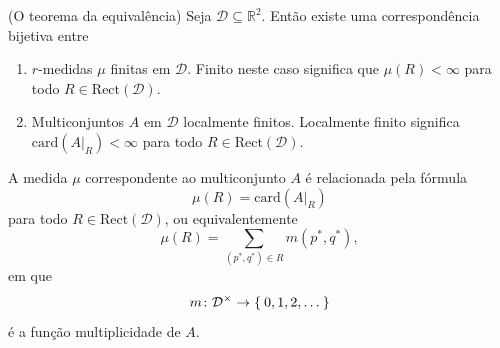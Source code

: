 \begin{teo}{(O teorema da equivalência)}\label{teo:equiv_meas}
    Seja $\mathcal{D} \subseteq \mathbb{R}^2$. Então existe uma correspondência bijetiva
    entre
    \begin{enumerate}
        \item $r$-medidas $\mu$ finitas em $\mathcal{D}$. Finito neste caso significa que 
        $\mu(R) < \infty$ para todo $R \in \text{Rect}(\mathcal{D})$.
        \item Multiconjuntos $A$ em $\mathcal{D}$ localmente finitos. Localmente finito significa
        $\text{card}(\left.A\right|_R) < \infty$ para todo $R \in \text{Rect}(\mathcal{D})$.
    \end{enumerate}
    A medida $\mu$ correspondente ao multiconjunto $A$ é relacionada pela fórmula
    \begin{equation}\label{eq:med_dgm}
        \mu(R) = \text{card}(\left.A\right|_R)
    \end{equation}
    para todo $R \in \text{Rect}(\mathcal{D})$, ou equivalentemente
    \begin{equation}\label{eq:med_mult}
        \mu(R) = \sum_{(p^*,q^*)\in R} m(p^*, q^*),
    \end{equation}
    em que
    \begin{equation*}
        m \colon \mathcal{D}^{\times} \to \Set{0,1,2,\dots}
    \end{equation*}
    é a função multiplicidade de $A$. 
\end{teo}
